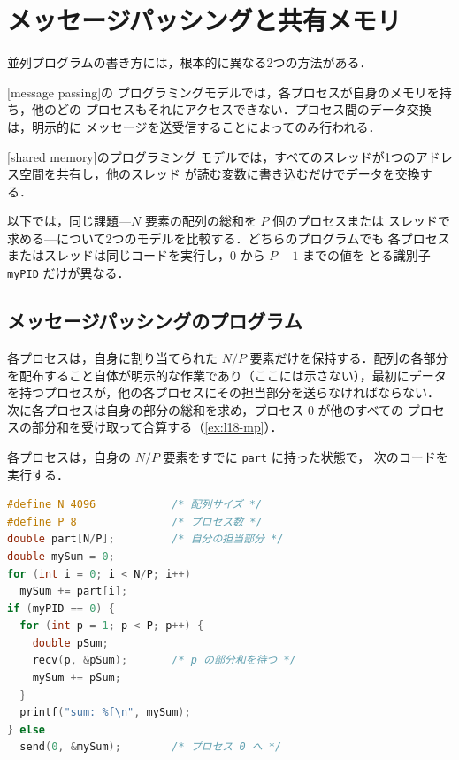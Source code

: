 \documentclass[../main.tex]{subfiles}
\begin{document}
\section{メッセージパッシングと共有メモリ}
\label{sec:l18-programs}

並列プログラムの書き方には，根本的に異なる2つの方法がある．

\begin{definition}[メッセージパッシング]
  [message passing]の
  プログラミングモデルでは，各プロセスが自身のメモリを持ち，他のどの
  プロセスもそれにアクセスできない．プロセス間のデータ交換は，明示的に
  メッセージを送受信することによってのみ行われる．
\end{definition}

\begin{definition}[共有メモリ]
  [shared memory]のプログラミング
  モデルでは，すべてのスレッドが1つのアドレス空間を共有し，他のスレッド
  が読む変数に書き込むだけでデータを交換する．
\end{definition}

以下では，同じ課題---$N$ 要素の配列の総和を $P$ 個のプロセスまたは
スレッドで求める---について2つのモデルを比較する．どちらのプログラムでも
各プロセスまたはスレッドは同じコードを実行し，0 から $P-1$ までの値を
とる識別子 \texttt{myPID} だけが異なる．

\subsection{メッセージパッシングのプログラム}

各プロセスは，自身に割り当てられた $N/P$ 要素だけを保持する．配列の各部分
を配布すること自体が明示的な作業であり（ここには示さない），最初にデータ
を持つプロセスが，他の各プロセスにその担当部分を送らなければならない．
次に各プロセスは自身の部分の総和を求め，プロセス 0 が他のすべての
プロセスの部分和を受け取って合算する（\cref{ex:l18-mp}）．

\begin{example}[メッセージパッシング]
  \label{ex:l18-mp}
  各プロセスは，自身の $N/P$ 要素をすでに \texttt{part} に持った状態で，
  次のコードを実行する．
  \begin{lstlisting}[language=C, numbers=none]
#define N 4096            /* 配列サイズ */
#define P 8               /* プロセス数 */
double part[N/P];         /* 自分の担当部分 */
double mySum = 0;
for (int i = 0; i < N/P; i++)
  mySum += part[i];
if (myPID == 0) {
  for (int p = 1; p < P; p++) {
    double pSum;
    recv(p, &pSum);       /* p の部分和を待つ */
    mySum += pSum;
  }
  printf("sum: %f\n", mySum);
} else
  send(0, &mySum);        /* プロセス 0 へ */
\end{lstlisting}
\end{example}
\end{document}
